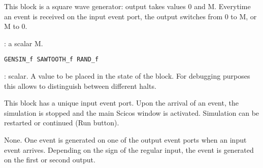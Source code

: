 %
%


\label{GENSQRf}

This block is a square wave generator: output takes values
0 and M. Everytime an event is received on the input event port,
the output switches from 0 to M, or M to 0.
\begin{scitem}
\item[{\verb?Amplitude?}]
: a scalar M.
\end{scitem}%
{\verb?GENSIN_f SAWTOOTH_f RAND_f?} \pageref{GENSINfSAWTOOTHfRANDf}






%
%


\label{CLOCKf}

\begin{scitem}
\item[{\verb?State on halt?}]
: scalar. A value to be placed in the state of the block. For
debugging purposes this allows to distinguish between different
halts.
\end{scitem}%
This block has a unique input event port. Upon the arrival of an
event,
the simulation is stopped and the main Scicos window is activated.
Simulation can be restarted or continued (Run button).








%
%


\label{IFTHELf}

None.
One event is generated on one of the output event ports when an
input event arrives. Depending on the sign of the regular input, 
the event is generated on the first or second output.








%
%


